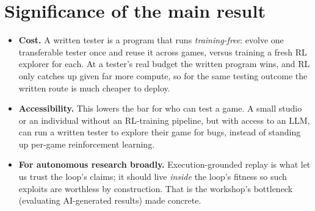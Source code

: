 \section{Significance of the main result}
\label{sec:significance}
\begin{itemize}\itemsep2pt
  \item \textbf{Cost.} A written tester is a program that runs \emph{training-free}: evolve one transferable tester once
  and reuse it across games, versus training a fresh RL explorer for each. At a tester's real budget the written program
  wins, and RL only catches up given far more compute, so for the same testing outcome the written route is much cheaper
  to deploy.
  \item \textbf{Accessibility.} This lowers the bar for who can test a game. A small studio or an individual without an
  RL-training pipeline, but with access to an LLM, can run a written tester to explore their game for bugs, instead of
  standing up per-game reinforcement learning.
  \item \textbf{For autonomous research broadly.} Execution-grounded replay is what let us trust the loop's claims; it
  should live \emph{inside} the loop's fitness so such exploits are worthless by construction. That is the workshop's
  bottleneck (evaluating AI-generated results) made concrete.
\end{itemize}
